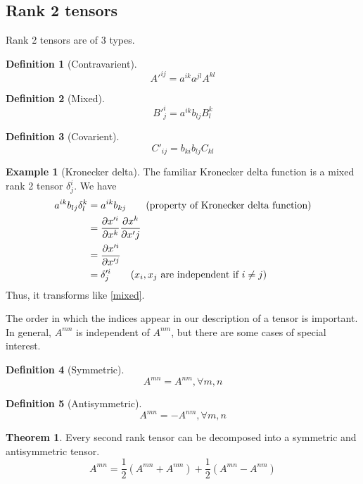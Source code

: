 \documentclass[10pt, a4paper]{extarticle}
\theoremstyle{definition}
\newtheorem{thm}{Theorem}
\newtheorem{defn}{Definition}
\newtheorem{eg}{Example}
\numberwithin{equation}{subsection}
\begin{document}
\subsection{Rank 2 tensors}
Rank 2 tensors are of 3 types.
\begin{framed}
	\begin{defn}[Contravarient]
		\begin{equation}
			A'^{ij}=a^{ik}a^{jl}A^{kl}
		\end{equation}
	\end{defn}
	\begin{defn}[Mixed]
		\begin{equation}\label{mixed}
			B'^i_j=a^{ik}b_{lj}B^k_l
		\end{equation}
	\end{defn}
	\begin{defn}[Covarient]
		\begin{equation}
			C'_{ij}=b_{ki}b_{lj}C_{kl}
		\end{equation}
	\end{defn}
\end{framed}
\begin{eg}[Kronecker delta]
	The familiar Kronecker delta function is a mixed rank 2 tensor $\delta^i_j$.
	We have
	\begin{align*}
		a^{ik}b_{lj}\delta_l^k&=a^{ik}b_{kj}\tag*{(property of Kronecker delta function)}\\
							  &=\pdv{x'^i}{x^k}\pdv{x^k}{x'{j}}\\
							  &=\pdv{x'^i}{x'^j}\\
							  &=\delta'^i_j\tag*{($x_i,x_j$ are independent if $i\neq j$)}
	\end{align*}
	Thus, it transforms like \eqref{mixed}.
\end{eg}
The order in which the indices appear in our description of a tensor is important. In general, $A^{mn}$ is independent of $A^{nm}$, but there are some cases of special interest.
\begin{framed}
	\begin{defn}[Symmetric]
		\begin{equation}
			A^{mn}=A^{nm},\forall m,n
		\end{equation}
	\end{defn}
	\begin{defn}[Antisymmetric]
		\begin{equation}
			A^{mn}=-A^{nm},\forall m,n
		\end{equation}
	\end{defn}
	\begin{thm}
		Every second rank tensor can be decomposed into a symmetric and antisymmetric tensor.
		\begin{equation}
			A^{mn}=\frac{1}{2}(A^{mn}+A^{nm})+\frac{1}{2}(A^{mn}-A^{nm})
		\end{equation}
	\end{thm}
\end{framed}
\end{document}
